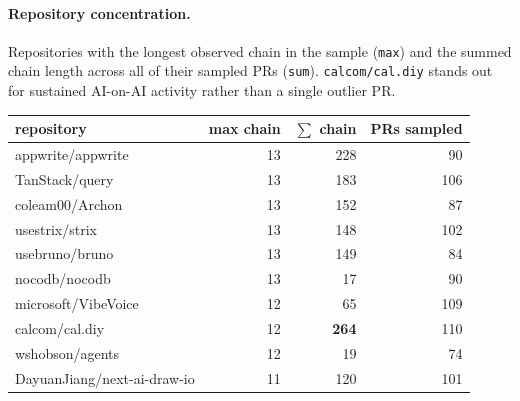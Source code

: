 \paragraph{Repository concentration.}
Repositories with the longest observed chain in the sample
(\texttt{max}) and the summed chain length across all of their sampled
PRs (\texttt{sum}). \texttt{calcom/cal.diy} stands out for sustained
AI-on-AI activity rather than a single outlier PR.

\begin{center}\small
\begin{tabular}{lrrr}
\toprule
repository & max chain & $\sum$ chain & PRs sampled \\
\midrule
appwrite/appwrite & 13 & 228 & 90 \\
TanStack/query & 13 & 183 & 106 \\
coleam00/Archon & 13 & 152 & 87 \\
usestrix/strix & 13 & 148 & 102 \\
usebruno/bruno & 13 & 149 & 84 \\
nocodb/nocodb & 13 & 17 & 90 \\
microsoft/VibeVoice & 12 & 65 & 109 \\
calcom/cal.diy & 12 & \textbf{264} & 110 \\
wshobson/agents & 12 & 19 & 74 \\
DayuanJiang/next-ai-draw-io & 11 & 120 & 101 \\
\bottomrule
\end{tabular}
\end{center}
